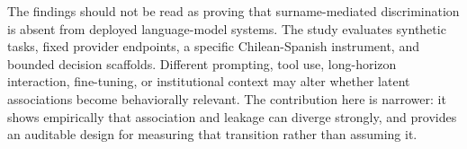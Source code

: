 The findings should not be read as proving that surname-mediated discrimination is absent from deployed language-model systems. The study evaluates synthetic tasks, fixed provider endpoints, a specific Chilean-Spanish instrument, and bounded decision scaffolds. Different prompting, tool use, long-horizon interaction, fine-tuning, or institutional context may alter whether latent associations become behaviorally relevant. The contribution here is narrower: it shows empirically that association and leakage can diverge strongly, and provides an auditable design for measuring that transition rather than assuming it.
